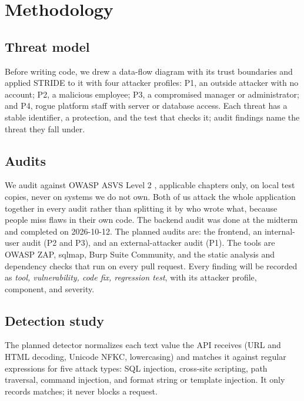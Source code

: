 \section{Methodology}

\subsection{Threat model}
Before writing code, we drew a data-flow diagram with its trust boundaries and applied STRIDE to it with four attacker profiles: P1, an outside attacker with no account; P2, a malicious employee; P3, a compromised manager or administrator; and P4, rogue platform staff with server or database access. Each threat has a stable identifier, a protection, and the test that checks it; audit findings name the threat they fall under. 

\subsection{Audits}
We audit against OWASP ASVS Level 2 \cite{asvs5}, applicable chapters only, on local test copies, never on systems we do not own. Both of us attack the whole application together in every audit rather than splitting it by who wrote what, because people miss flaws in their own code. The backend audit was done at the midterm and completed on 2026-10-12. The planned audits are: the frontend, an internal-user audit (P2 and P3), and an external-attacker audit (P1). The tools are OWASP ZAP, sqlmap, Burp Suite Community, and the static analysis and dependency checks that run on every pull request. Every finding will be recorded as \emph{tool, vulnerability, code fix, regression test}, with its attacker profile, component, and severity. 

\subsection{Detection study}
The planned detector normalizes each text value the API receives (URL and HTML decoding, Unicode NFKC, lowercasing) and matches it against regular expressions for five attack types: SQL injection, cross-site scripting, path traversal, command injection, and format string or template injection. It only records matches; it never blocks a request. 

